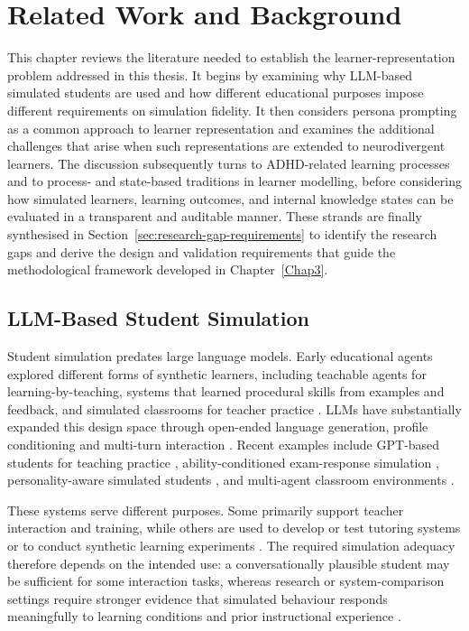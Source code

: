 \chapter{Related Work and Background} \label{Chap2}

This chapter reviews the literature needed to establish the learner-representation problem addressed in this thesis. It begins by examining why LLM-based simulated students are used and how different educational purposes impose different requirements on simulation fidelity. It then considers persona prompting as a common approach to learner representation and examines the additional challenges that arise when such representations are extended to neurodivergent learners. The discussion subsequently turns to ADHD-related learning processes and to process- and state-based traditions in learner modelling, before considering how simulated learners, learning outcomes, and internal knowledge states can be evaluated in a transparent and auditable manner. These strands are finally synthesised in Section~\ref{sec:research-gap-requirements} to identify the research gaps and derive the design and validation requirements that guide the methodological framework developed in Chapter~\ref{Chap3}.

\section{LLM-Based Student Simulation}
\label{sec:llm-student-simulation}

Student simulation predates large language models. Early educational agents explored different forms of synthetic learners, including teachable agents for learning-by-teaching, systems that learned procedural skills from examples and feedback, and simulated classrooms for teacher practice \cite{biswas-etal-2005-learning,matsuda-etal-2013-cognitive,christensen-etal-2011-simschool}. LLMs have substantially expanded this design space through open-ended language generation, profile conditioning and multi-turn interaction \cite{chu-etal-2025-llm}. Recent examples include GPT-based students for teaching practice \cite{markel-etal-2023-gpteach}, ability-conditioned exam-response simulation \cite{benedetto-etal-2024-using}, personality-aware simulated students \cite{liu-etal-2024-personality}, and multi-agent classroom environments \cite{zhang-etal-2025-simulating}.

These systems serve different purposes. Some primarily support teacher interaction and training, while others are used to develop or test tutoring systems or to conduct synthetic learning experiments \cite{weitekamp-etal-2025-tutorgym,xu-etal-2025-classroom}. The required simulation adequacy therefore depends on the intended use: a conversationally plausible student may be sufficient for some interaction tasks, whereas research or system-comparison settings require stronger evidence that simulated behaviour responds meaningfully to learning conditions and prior instructional experience \cite{harris-etal-2020-framework,yuan-etal-2026-towards}.

